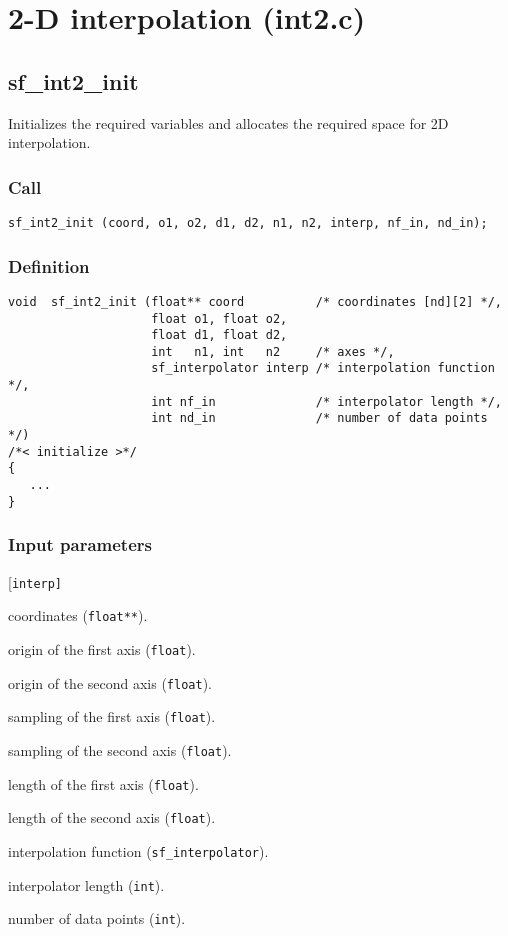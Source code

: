 \section{2-D interpolation (int2.c)}




\subsection{{sf\_int2\_init}}\label{sec:sf_int2_init}
Initializes the required variables and allocates the required space for 2D interpolation.

\subsubsection*{Call}
\begin{verbatim}sf_int2_init (coord, o1, o2, d1, d2, n1, n2, interp, nf_in, nd_in);\end{verbatim}

\subsubsection*{Definition}
\begin{verbatim}
void  sf_int2_init (float** coord          /* coordinates [nd][2] */, 
                    float o1, float o2, 
                    float d1, float d2,
                    int   n1, int   n2     /* axes */, 
                    sf_interpolator interp /* interpolation function */, 
                    int nf_in              /* interpolator length */, 
                    int nd_in              /* number of data points */)
/*< initialize >*/
{
   ...
}
\end{verbatim}

\subsubsection*{Input parameters}
\begin{desclist}{\tt }{\quad}[\tt interp]
   \setlength\itemsep{0pt}
   \item[coord]   coordinates (\texttt{float**}).  
   \item[o1]     origin of the first axis (\texttt{float}).  
   \item[o2]     origin of the second axis (\texttt{float}).  
   \item[d1]     sampling of the first axis (\texttt{float}).  
   \item[d2]     sampling of the second axis (\texttt{float}).  
   \item[n1]     length of the first axis (\texttt{float}).  
   \item[n2]     length of the second axis (\texttt{float}).  
   \item[interp] interpolation function (\texttt{sf\_interpolator}).  
   \item[nf\_in] interpolator length (\texttt{int}).  
   \item[nd\_in] number of data points (\texttt{int}).  
\end{desclist}




